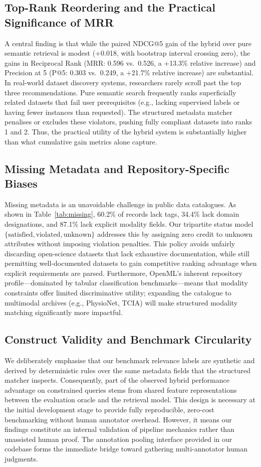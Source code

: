 \documentclass[conference]{IEEEtran}
\begin{document}
\subsection{Top-Rank Reordering and the Practical Significance of MRR}
A central finding is that while the paired NDCG@5 gain of the hybrid over pure semantic retrieval is modest (+0.018, with bootstrap interval crossing zero), the gains in Reciprocal Rank (MRR: 0.596 vs.\ 0.526, a +13.3\% relative increase) and Precision at 5 (P@5: 0.303 vs.\ 0.249, a +21.7\% relative increase) are substantial. In real-world dataset discovery systems, researchers rarely scroll past the top three recommendations. Pure semantic search frequently ranks superficially related datasets that fail user prerequisites (e.g., lacking supervised labels or having fewer instances than requested). The structured metadata matcher penalises or excludes these violators, pushing fully compliant datasets into ranks 1 and 2. Thus, the practical utility of the hybrid system is substantially higher than what cumulative gain metrics alone capture.

\subsection{Missing Metadata and Repository-Specific Biases}
Missing metadata is an unavoidable challenge in public data catalogues. As shown in Table~\ref{tab:missing}, 60.2\% of records lack tags, 34.4\% lack domain designations, and 87.1\% lack explicit modality fields. Our tripartite status model $\{\text{satisfied}, \text{violated}, \text{unknown}\}$ addresses this by assigning zero credit to unknown attributes without imposing violation penalties. This policy avoids unfairly discarding open-science datasets that lack exhaustive documentation, while still permitting well-documented datasets to gain competitive ranking advantage when explicit requirements are parsed. Furthermore, OpenML's inherent repository profile—dominated by tabular classification benchmarks—means that modality constraints offer limited discriminative utility; expanding the catalogue to multimodal archives (e.g., PhysioNet, TCIA) will make structured modality matching significantly more impactful.

\subsection{Construct Validity and Benchmark Circularity}
We deliberately emphasise that our benchmark relevance labels are synthetic and derived by deterministic rules over the same metadata fields that the structured matcher inspects. Consequently, part of the observed hybrid performance advantage on constrained queries stems from shared feature representations between the evaluation oracle and the retrieval model. This design is necessary at the initial development stage to provide fully reproducible, zero-cost benchmarking without human annotator overhead. However, it means our findings constitute an internal validation of pipeline mechanics rather than unassisted human proof. The annotation pooling interface provided in our codebase forms the immediate bridge toward gathering multi-annotator human judgments.
\end{document}
